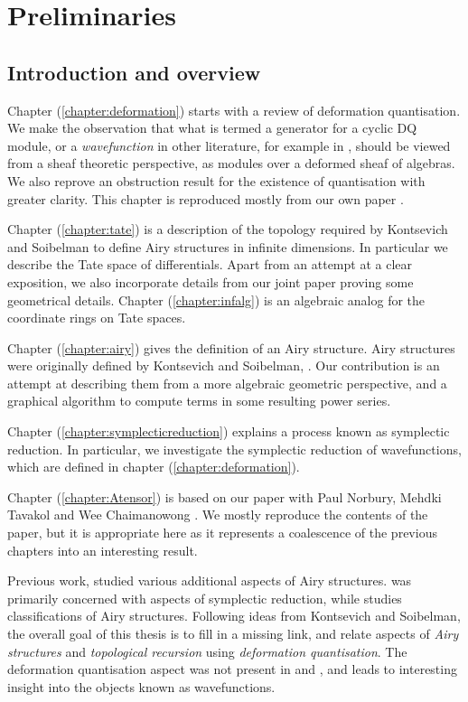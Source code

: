 \chapter{Preliminaries}
    \label{chapter:prelim}


    \section{Introduction and overview}
    

    Chapter (\ref{chapter:deformation}) starts with a review of deformation quantisation. We make the observation that what is termed a generator for a cyclic DQ module, or a \emph{wavefunction} in other literature, for example in \cite{ks_airy}, should be viewed from a sheaf theoretic perspective, as modules over a deformed sheaf of algebras. We also reprove an obstruction result for the existence of quantisation with greater clarity. This chapter is reproduced mostly from our own paper \cite{swaddledef}.
    
    Chapter (\ref{chapter:tate}) is a description of the topology required by Kontsevich and Soibelman to define Airy structures in infinite dimensions. In particular we describe the Tate space of differentials. Apart from an attempt at a clear exposition, we also incorporate details from our joint paper \cite{chaimanowong2020airy} proving some geometrical details. Chapter (\ref{chapter:infalg}) is an algebraic analog for the coordinate rings on Tate spaces. 
    
    Chapter (\ref{chapter:airy}) gives the definition of an Airy structure. Airy structures were originally defined by Kontsevich and Soibelman,  \cite{ks_airy}. Our contribution is an attempt at describing them from a more algebraic geometric perspective, and a graphical algorithm to compute terms in some resulting power series.
    
    Chapter (\ref{chapter:symplecticreduction}) explains a process known as symplectic reduction. In particular, we investigate the symplectic reduction of wavefunctions, which are defined in chapter (\ref{chapter:deformation}).
    
    Chapter (\ref{chapter:Atensor}) is based on our paper with Paul Norbury, Mehdki Tavakol and Wee Chaimanowong \cite{chaimanowong2020airy}. We mostly reproduce the contents of the paper, but it is appropriate here as it represents a coalescence of the previous chapters into an interesting result. 
    
    Previous work, \cite{chaimanowong2020airy, abcd, higherairy, eynard_orantin} studied various additional aspects of Airy structures. \cite{chaimanowong2020airy} was primarily concerned with aspects of symplectic reduction, while \cite{abcd} studies classifications of Airy structures. Following ideas from Kontsevich and Soibelman, the overall goal of this thesis is to fill in a missing link, and relate aspects of \emph{Airy structures} and \emph{topological recursion} using \emph{deformation quantisation}. The deformation quantisation aspect was not present in \cite{chaimanowong2020airy} and \cite{abcd}, and leads to interesting insight into the objects known as wavefunctions.

